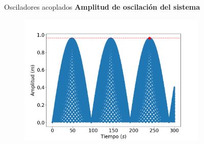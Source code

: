 \begin{frame}{Osciladores acoplados}
    \textbf{Amplitud de oscilación del sistema}
    \begin{minipage}[c]{0.8\linewidth}
        \begin{figure}[H]
            \centering
            \includegraphics[width=0.8\textwidth]{pic/05-results/system_amplitude}
            \label{fig:system-amplitude}
        \end{figure}
    \end{minipage}
    \begin{minipage}{0.15\linewidth}
        \large{}
    \end{minipage}
\end{frame}

